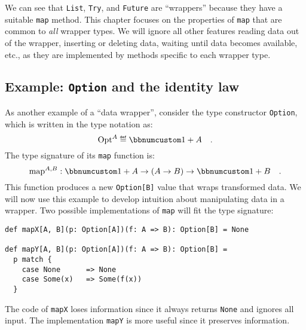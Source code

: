 We can see that \lstinline!List!, \lstinline!Try!, and \lstinline!Future!
are \textsf{``}wrappers\textsf{''} because they have a suitable \lstinline!map! method.
This chapter focuses on the properties of \lstinline!map! that are
common to \emph{all} wrapper types. We will ignore all other features
\textemdash{} reading data out of the wrapper, inserting or deleting
data, waiting until data becomes available, etc., \textemdash{} as
they are implemented by methods specific to each wrapper type.

\subsection{Example: \texttt{Option} and the identity law\label{subsec:f-Example:-Option-and}}

As another example of a \textsf{``}data wrapper\textsf{''}, consider the type constructor
\lstinline!Option!, which is written in the type notation as:
\[
\text{Opt}^{A}\triangleq\bbnum 1+A\quad.
\]
The type signature of its \lstinline!map! function is:
\[
\text{map}^{A,B}:\bbnum 1+A\rightarrow\left(A\rightarrow B\right)\rightarrow\bbnum 1+B\quad.
\]
This function produces a new \lstinline!Option[B]! value that wraps
transformed data. We will now use this example to develop intuition
about manipulating data in a wrapper. Two possible implementations
of \lstinline!map! will fit the type signature:
\begin{lstlisting}
def mapX[A, B](p: Option[A])(f: A => B): Option[B] = None

def mapY[A, B](p: Option[A])(f: A => B): Option[B] =
  p match {
    case None      => None
    case Some(x)   => Some(f(x))
  }
\end{lstlisting}
The code of \lstinline!mapX! loses information
since it always returns \lstinline!None! and ignores all input. The
implementation \lstinline!mapY! is more useful since it preserves
information. 

